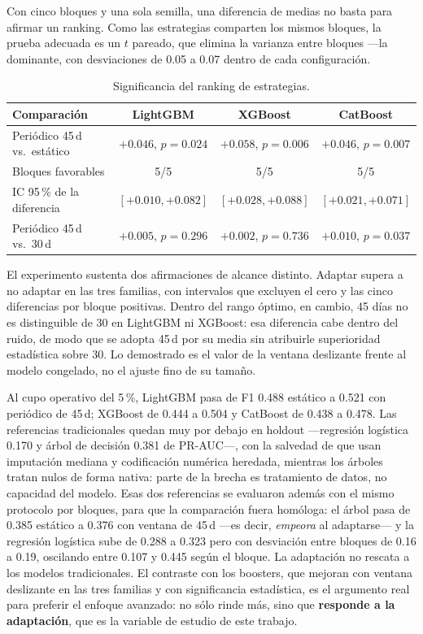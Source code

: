 \documentclass[11pt,letterpaper]{article}
\begin{document}
Con cinco bloques y una sola semilla, una diferencia de medias no basta para afirmar un ranking. Como las estrategias comparten los mismos bloques, la prueba adecuada es un $t$ pareado, que elimina la varianza entre bloques —la dominante, con desviaciones de 0.05 a 0.07 dentro de cada configuración.

\begin{table}[H]\centering\small
\begin{tabular}{@{}lccc@{}}\toprule
Comparación & LightGBM & XGBoost & CatBoost\\\midrule
Periódico 45\,d vs.\ estático & $+0.046$, $p=\mathbf{0.024}$ & $+0.058$, $p=\mathbf{0.006}$ & $+0.046$, $p=\mathbf{0.007}$\\
Bloques favorables & 5/5 & 5/5 & 5/5\\
IC 95\,\% de la diferencia & $[+0.010,+0.082]$ & $[+0.028,+0.088]$ & $[+0.021,+0.071]$\\
Periódico 45\,d vs.\ 30\,d & $+0.005$, $p=0.296$ & $+0.002$, $p=0.736$ & $+0.010$, $p=0.037$\\\bottomrule
\end{tabular}
\caption{Significancia del ranking de estrategias.}
\end{table}

El experimento sustenta dos afirmaciones de alcance distinto. Adaptar supera a no adaptar en las tres familias, con intervalos que excluyen el cero y las cinco diferencias por bloque positivas. Dentro del rango óptimo, en cambio, 45 días no es distinguible de 30 en LightGBM ni XGBoost: esa diferencia cabe dentro del ruido, de modo que se adopta 45\,d por su media sin atribuirle superioridad estadística sobre 30. Lo demostrado es el valor de la ventana deslizante frente al modelo congelado, no el ajuste fino de su tamaño.

Al cupo operativo del 5\,\%, LightGBM pasa de F1 0.488 estático a 0.521 con periódico de 45\,d; XGBoost de 0.444 a 0.504 y CatBoost de 0.438 a 0.478. Las referencias tradicionales quedan muy por debajo en holdout —regresión logística 0.170 y árbol de decisión 0.381 de PR-AUC—, con la salvedad de que usan imputación mediana y codificación numérica heredada, mientras los árboles tratan nulos de forma nativa: parte de la brecha es tratamiento de datos, no capacidad del modelo. Esas dos referencias se evaluaron además con el mismo protocolo por bloques, para que la comparación fuera homóloga: el árbol pasa de 0.385 estático a 0.376 con ventana de 45\,d —es decir, \emph{empeora} al adaptarse— y la regresión logística sube de 0.288 a 0.323 pero con desviación entre bloques de 0.16 a 0.19, oscilando entre 0.107 y 0.445 según el bloque. La adaptación no rescata a los modelos tradicionales. El contraste con los boosters, que mejoran con ventana deslizante en las tres familias y con significancia estadística, es el argumento real para preferir el enfoque avanzado: no sólo rinde más, sino que \textbf{responde a la adaptación}, que es la variable de estudio de este trabajo.
\end{document}
